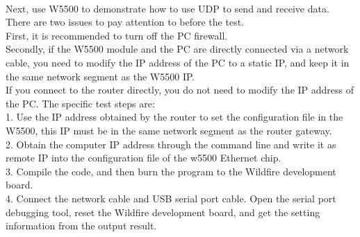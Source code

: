 \\
Next, use W5500 to demonstrate how to use UDP to send and receive data. There are two issues to pay attention to before the test. 
\\
First, it is recommended to turn off the PC firewall.
\\
Secondly, if the W5500 module and the PC are directly connected via a network cable, you need to modify the IP address of the PC to a static IP, and keep it in the same network segment as the W5500 IP. 
\\
If you connect to the router directly, you do not need to modify the IP address of the PC. The specific test steps are:
\\
1. Use the IP address obtained by the router to set the configuration file in the W5500, this IP must be in the same network segment as the router gateway.
\\
2. Obtain the computer IP address through the command line and write it as remote IP into the configuration file of the w5500 Ethernet chip.
\\
3. Compile the code, and then burn the program to the Wildfire development board.
\\
4. Connect the network cable and USB serial port cable. Open the serial port debugging tool, reset the Wildfire development board, and get the setting information from the output result.

